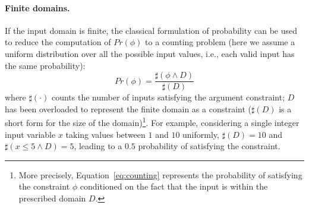 %		

\paragraph{Finite domains.} 

If the input domain is finite, the classical formulation of probability can be used to reduce the computation of $Pr(\phi)$ to a counting problem (here we assume a uniform distribution over all the possible input values, i.e., each valid input has the same probability):
%
\begin{equation}\label{eq:counting}
	Pr(\phi) = \frac{\sharp(\phi \land D)}{\sharp(D)}
\end{equation}
%
\noindent where $\sharp(\cdot)$ counts the number of inputs satisfying the argument constraint; $D$ has been overloaded to represent the finite domain as a constraint ($\sharp(D)$ is a short form for the size of the domain)\footnote{More precisely, Equation~\eqref{eq:counting} represents the probability of satisfying the constraint $\phi$ conditioned on the fact that the input is within the prescribed domain $D$.}. For example, considering a single integer input variable $x$ taking values between $1$ and $10$ uniformly, $\sharp(D)=10$ and $\sharp(x\leq5 \land D)=5$, leading to a $0.5$ probability of satisfying the constraint.

